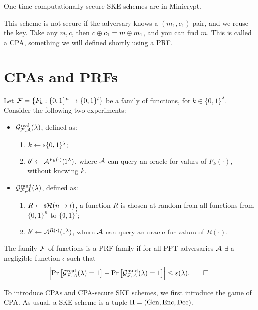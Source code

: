 \begin{corollary}
	One-time computationally secure \ac{SKE} schemes are in Minicrypt.
\end{corollary}

This scheme is not secure if the adversary knows a $(m_1, c_1)$ pair, and we reuse the key.
Take any $m, c$, then $c \oplus c_1 = m \oplus m_1$, and you can find $m$.
This is called a \ac{CPA}, something we will defined shortly using a \ac{PRF}.

\section{\aclp{CPA} and \aclp{PRF}}

\begin{definition}
	Let $\mathcal{F} = \{ F_k : \{0,1\}^{n} \to \{0,1\}^{l} \}$ be a family of functions, for $k \in \{0,1\}^{\lambda}$.
	Consider the following two experiments:
	\begin{itemize}
		\item $\mathcal{G}^{\scriptstyle \text{real}}_{\mathcal{F}, \mathcal{A}}(\lambda)$, defined as:
			\begin{enumerate}
				\item $k \leftarrow {\scriptstyle \$} {\{0,1\}^{\lambda}}$;
				\item $b' \leftarrow \mathcal{A}^{F_k(\cdot)}(1^{\lambda})$, where $\mathcal{A}$ can query an oracle for values of $F_k(\cdot)$, without knowing $k$.
			\end{enumerate}
		\item $\mathcal{G}^{\scriptstyle \text{rand}}_{\mathcal{F}, \mathcal{A}}(\lambda)$, defined as:
			\begin{enumerate}
				\item $R \leftarrow {\scriptstyle \$} {\mathcal{R}(n \to l)}$, \ie a function $R$ is chosen at random from all functions from $\{0,1\}^{n}$ to $\{0,1\}^{l}$;
				\item $b' \leftarrow \mathcal{A}^{R(\cdot)}(1^{\lambda})$, where $\mathcal{A}$ can query an oracle for values of $R(\cdot)$.
			\end{enumerate}
	\end{itemize}
	The family $\mathcal{F}$ of functions is a \ac{PRF} family if for all \ac{PPT} adversaries $\mathcal{A}$ $\exists$ a negligible function $\epsilon$ such that
	\begin{equation*}
		\left|{
			\mathop{\mathrm{Pr}}\limits_{} \left[ {\mathcal{G}^{\scriptstyle \text{real}}_{\mathcal{F}, \mathcal{A}}(\lambda) = 1} \right]
			-
			\mathop{\mathrm{Pr}}\limits_{} \left[ {\mathcal{G}^{\scriptstyle \text{rand}}_{\mathcal{F}, \mathcal{A}}(\lambda) = 1} \right]
		}\right|
		\le \varepsilon(\lambda). \qedhere
	\end{equation*}
\end{definition}

To introduce \acp{CPA} and \ac{CPA}-secure \ac{SKE} schemes, we first introduce the game of \ac{CPA}.
As usual, a \ac{SKE} scheme is a tuple $\Pi = \left( \mathrm{Gen} , \allowbreak \mathrm{Enc} , \allowbreak \mathrm{Dec} \right)$.

